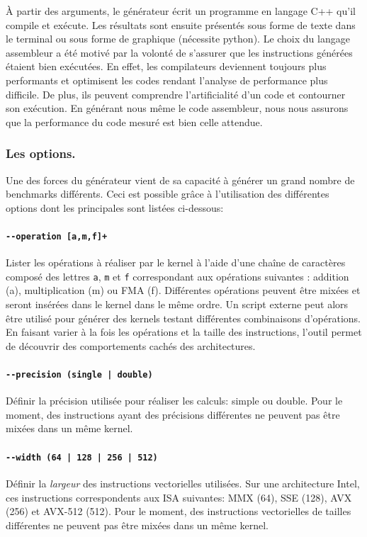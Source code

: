         À partir des arguments, le générateur écrit un programme en langage C++ qu'il compile et exécute. Les résultats sont ensuite présentés sous forme de texte dans le terminal ou sous forme de graphique (nécessite python).
        Le choix du langage assembleur a été motivé par la volonté de s'assurer que les instructions générées étaient bien exécutées. En effet, les compilateurs deviennent toujours plus performants et optimisent les codes rendant l'analyse de performance plus difficile. De plus, ils peuvent comprendre l'artificialité d'un code et contourner son exécution. En générant nous même le code assembleur, nous nous assurons que la performance du code mesuré est bien celle attendue.
    
       
    \subsubsection{Les options.}\label{sec:kg_option} 
    
        Une des forces du générateur vient de sa capacité à générer un grand nombre de benchmarks différents. Ceci est possible grâce à l'utilisation des différentes options dont les principales sont listées ci-dessous:
    
        \paragraph{\texttt{-{}-operation [a,m,f]+}} Lister les opérations à réaliser par le kernel à l'aide d'une chaîne de caractères composé des lettres \texttt{a}, \texttt{m} et \texttt{f} correspondant aux opérations suivantes : addition (a), multiplication (m) ou \gls{FMA} (f). Différentes opérations peuvent être mixées et seront insérées dans le \gls{kernel} dans le même ordre. Un script externe peut alors être utilisé pour générer des kernels testant différentes combinaisons d'opérations. En faisant varier à la fois les opérations et la taille des instructions, l'outil permet de découvrir des comportements cachés des architectures.

        \paragraph{\texttt{-{}-precision (single | double)}} Définir la précision utilisée pour réaliser les calculs: simple ou double. Pour le moment, des instructions ayant des précisions différentes ne peuvent pas être mixées dans un même kernel.
        
        \paragraph{\texttt{-{}-width (64 | 128 | 256 | 512)}} Définir la \textit{largeur} des instructions vectorielles utilisées. Sur une architecture Intel, ces instructions correspondents aux ISA suivantes: MMX (64), SSE (128), AVX (256) et AVX-512 (512). Pour le moment, des instructions vectorielles de tailles  différentes ne peuvent pas être mixées dans un même kernel.
        
